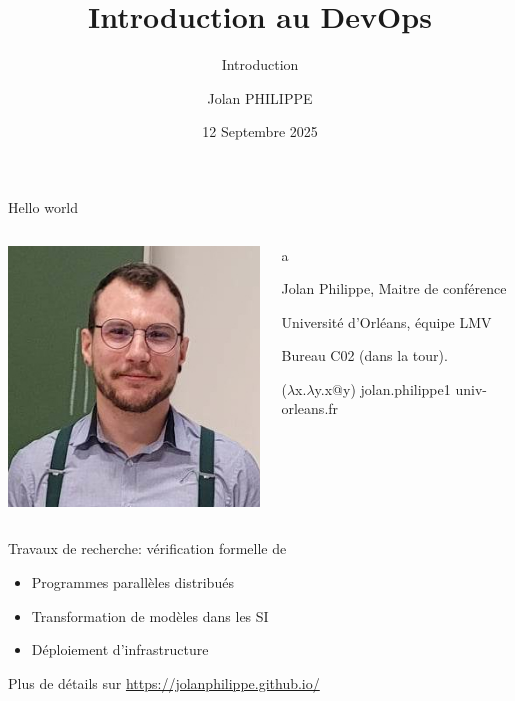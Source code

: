 \documentclass[aspectratio=169,10pt]{beamer}
\title{Introduction au DevOps}
\subtitle{Introduction}
\date{12 Septembre 2025}
\author{Jolan PHILIPPE}
\institute{Université d'Orléans}
\begin{document}
\begin{frame}
    \titlepage 
\end{frame}


\begin{frame}{Hello world}
    
\begin{columns}[T]
\begin{column}{.3\textwidth} 
\includegraphics[scale=1]{images/jolan.jpg}
\end{column}
\hspace{-1in}
\begin{column}{.7\textwidth}

{\color{white}a}


Jolan Philippe, Maitre de conférence

Université d'Orléans, équipe LMV

Bureau C02 (dans la tour).

($\lambda$x.$\lambda$y.x@y) jolan.philippe1 univ-orleans.fr

\vspace{1cm}

\end{column}
\end{columns}

Travaux de recherche: vérification formelle de
\vspace{-0.1cm}
\begin{itemize}
    \item Programmes parallèles distribués
    \item Transformation de modèles dans les SI
    \item Déploiement d'infrastructure
\end{itemize}
Plus de détails sur  
\url{https://jolanphilippe.github.io/}
 
\end{frame}
\end{document}
